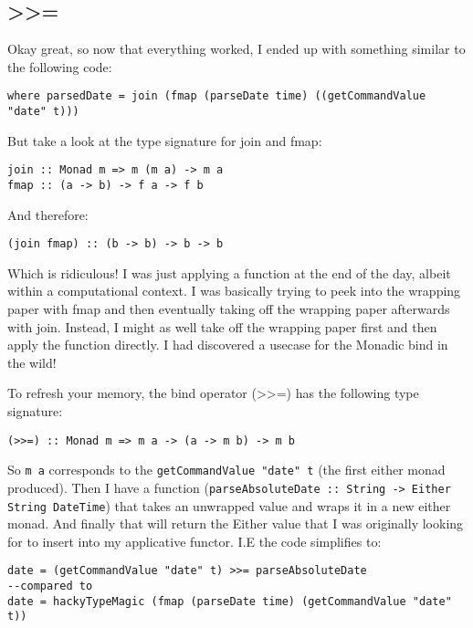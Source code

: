 \documentclass[12pt]{article}
\begin{document}
  \subsection{>>=}
    Okay great, so now that everything worked, I ended up with something similar to the following code:

    \begin{verbatim}
where parsedDate = join (fmap (parseDate time) ((getCommandValue "date" t)))
    \end{verbatim}

    But take a look at the type signature for join and fmap:

    \begin{verbatim}
join :: Monad m => m (m a) -> m a
fmap :: (a -> b) -> f a -> f b
    \end{verbatim}

    And therefore:

    \begin{verbatim}
(join fmap) :: (b -> b) -> b -> b
    \end{verbatim}

    Which is ridiculous! I was just applying a function at the end of the day, albeit within a computational context. I was basically trying to peek into the wrapping paper with fmap and then eventually taking off the wrapping paper afterwards with join. Instead, I might as well take off the wrapping paper first and then apply the function directly. I had discovered a usecase for the Monadic bind in the wild!

    To refresh your memory, the bind operator (>>=) has the following type signature:

    \begin{verbatim}
(>>=) :: Monad m => m a -> (a -> m b) -> m b 
    \end{verbatim}

    So \texttt{m a} corresponds to the \texttt{getCommandValue "date" t} (the first either monad produced). Then I have a function (\texttt{parseAbsoluteDate :: String -> Either String DateTime}) that takes an unwrapped value and wraps it in a new either monad. And finally that will return the Either value that I was originally looking for to insert into my applicative functor. I.E the code simplifies to:

    \begin{verbatim}
date = (getCommandValue "date" t) >>= parseAbsoluteDate
--compared to 
date = hackyTypeMagic (fmap (parseDate time) (getCommandValue "date" t))
    \end{verbatim}
\end{document}
